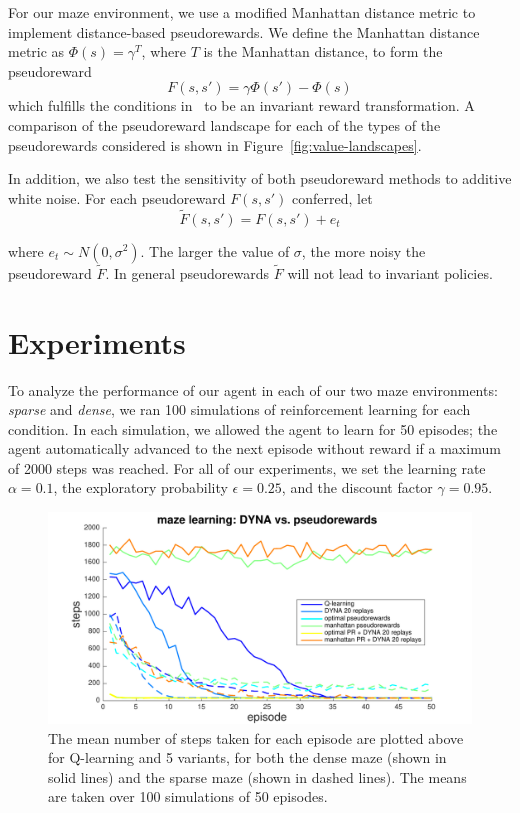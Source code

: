 \documentclass[notitlepage]{article}
\begin{document}
For our maze environment, we use a modified Manhattan distance metric to implement distance-based pseudorewards. We define the Manhattan distance metric as $\Phi(s) = \gamma^T$, where $T$ is the Manhattan distance, to form the pseudoreward
\begin{equation}
F(s, s') = \gamma \Phi(s') - \Phi(s)
\end{equation} 
which fulfills the conditions in~\cite{ng1999policy} to be an invariant reward transformation. A comparison of the pseudoreward landscape for each of the types of the pseudorewards considered is shown in Figure~\ref{fig:value-landscapes}.

In addition, we also test the sensitivity of both pseudoreward methods to additive white noise. For each pseudoreward $F(s, s')$ conferred, let
\begin{equation}
\tilde{F}(s, s') = F(s, s') + e_t
\end{equation} 

\noindent where $e_t \sim N(0, \sigma^2)$. The larger the value of $\sigma$, the more noisy the pseudoreward $\tilde{F}$. In general pseudorewards $\tilde{F}$ will not lead to invariant policies.

\section*{Experiments}

To analyze the performance of our agent in each of our two maze environments: \textit{sparse} and \textit{dense}, we ran 100 simulations of reinforcement learning for each condition. In each simulation, we allowed the agent to learn for 50 episodes; the agent automatically advanced to the next episode without reward if a maximum of 2000 steps was reached. For all of our experiments, we set the learning rate $\alpha = 0.1$, the exploratory probability $\epsilon = 0.25$, and the discount factor $\gamma = 0.95$. 

\begin{figure}[ht]
\includegraphics[width=\textwidth]{modelCompareNoNoise}
\caption{The mean number of steps taken for each episode are plotted above for Q-learning and 5 variants, for both the dense maze (shown in solid lines) and the sparse maze (shown in dashed lines). The means are taken over 100 simulations of 50 episodes.}
\label{fig:model-compare}
\end{figure}
\end{document}
